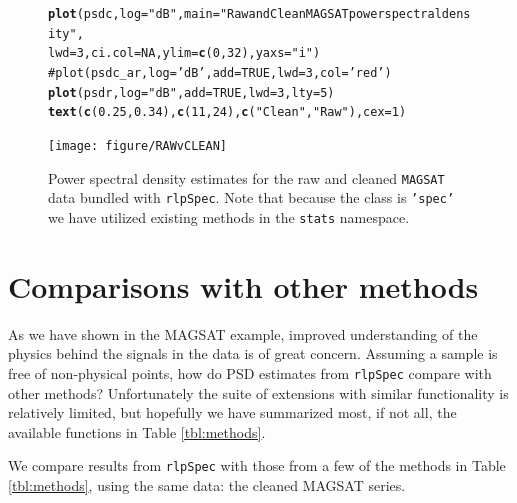 \documentclass{article}\usepackage{graphicx, color}
\makeatletter
\newcommand{\hlfunctioncall}[1]{\textcolor[rgb]{0.501960784313725,0,0.329411764705882}{\textbf{#1}}}%
\newcommand{\hlstring}[1]{\textcolor[rgb]{0.6,0.6,1}{#1}}%
\newcommand{\hlcomment}[1]{\textcolor[rgb]{0.180392156862745,0.6,0.341176470588235}{#1}}%
\newenvironment{kframe}{%
 \def\at@end@of@kframe{}%
 \ifinner\ifhmode%
  \def\at@end@of@kframe{\end{minipage}}%
  \begin{minipage}{\columnwidth}%
 \fi\fi%
 \def\FrameCommand##1{\hskip\@totalleftmargin \hskip-\fboxsep
 \colorbox{shadecolor}{##1}\hskip-\fboxsep
     \hskip-\linewidth \hskip-\@totalleftmargin \hskip\columnwidth}%
 \MakeFramed {\advance\hsize-\width
   \@totalleftmargin\z@ \linewidth\hsize
   \@setminipage}}%
 {\par\unskip\endMakeFramed%
 \at@end@of@kframe}
\newenvironment{knitrout}{}{} %
\newcommand{\Rcmd}[1]{\texttt{#1}}
\newcommand{\rlp}[0]{\Rcmd{rlpSpec}}
\makeatother
\begin{document}
%
\begin{figure}[htb!]
\begin{center}
\begin{knitrout}
\color{fgcolor}\begin{kframe}
\begin{alltt}
\hlfunctioncall{plot}(psdc, log = \hlstring{"dB"}, main = \hlstring{"Raw and Clean MAGSAT power spectral density"}, 
    lwd = 3, ci.col = NA, ylim = \hlfunctioncall{c}(0, 32), yaxs = \hlstring{"i"})
\hlcomment{# plot(psdc_ar, log='dB', add=TRUE, lwd=3, col='red')}
\hlfunctioncall{plot}(psdr, log = \hlstring{"dB"}, add = TRUE, lwd = 3, lty = 5)
\hlfunctioncall{text}(\hlfunctioncall{c}(0.25, 0.34), \hlfunctioncall{c}(11, 24), \hlfunctioncall{c}(\hlstring{"Clean"}, \hlstring{"Raw"}), cex = 1)
\end{alltt}
\end{kframe}
\texttt{[image: figure/RAWvCLEAN]} 

\end{knitrout}

\caption{Power spectral density estimates for the raw and cleaned
             \Rcmd{MAGSAT} data bundled with \rlp{}. Note that
             because the class is \Rcmd{'spec'} we have
             utilized  existing methods in the \Rcmd{stats} namespace.}
\label{fig:pmag}
\end{center}
\end{figure}

\section{Comparisons with other methods}

As we have shown in the MAGSAT example, 
improved understanding of the physics behind the signals in the data
is of great concern.
Assuming a sample is free of non-physical points, how do
PSD estimates from \rlp{}
compare with other methods?
Unfortunately the suite of extensions with similar functionality
is relatively limited, but hopefully we have
summarized most, if not all, the available functions in Table \ref{tbl:methods}.



We compare results from
\rlp{} with those from a few of the methods in Table \ref{tbl:methods},
using the same data: the cleaned MAGSAT series.
\end{document}
